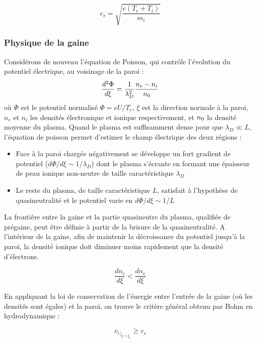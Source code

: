 \begin{refsection}
\begin{equation}
c_s=\sqrt{\frac{e (T_{e}+T_{i})}{m_{i}}}
\end{equation}

\subsubsection{Physique de la gaine}
\label{1-gaine}
Considérons de nouveau l'équation de Poisson, qui contrôle l'évolution du
potentiel électrique, au voisinage de la paroi :
\begin{equation}
\frac{d^{{2}}\Phi}{d\xi}=\frac{1}{\lambda_D^{{2}}}\frac{n_{e}-n_{i}}{n{_{0}}}
\end{equation}
 où $\Phi$ est le potentiel normalisé $\Phi=eU/T_{e}$, $\xi$ est la
 direction normale à la paroi, $n_{e}$ et $n_{i}$ les densités
 électronique et ionique respectivement, et $n{_{0}}$ la densité
 moyenne du plasma. Quand le plasma est suffisamment dense pour que $\lambda_D\ll
 L$, l'équation de poisson permet d'estimer le champ électrique des deux
 régions :

 \begin{itemize}
   \item Face à la paroi chargée négativement se
   développe un fort gradient de potentiel ($d\Phi/d\xi\sim 1/\lambda_D$) dont le plasma
   s'écrante en formant une épaisseur de peau ionique non-neutre de
   taille caractéristique $\lambda_D$
   \item Le reste du plasma, de taille caractéristique $L$, satisfait
   à l'hypothèse de quasineutralité et le potentiel varie en
   $d\Phi/d\xi\sim1/L$
 \end{itemize}

La frontière entre la gaine et la partie
quasineutre du plasma, qualifiée de prégaine, peut être définie à partir de la
brisure de la quasineutralité. A l'intérieur de la gaine, afin de maintenir la
décroissance du potentiel jusqu'à la paroi, la densité ionique doit diminuer
moins rapidement que la densité d'électrons. 

\begin{equation}
	\frac{dn_{i}}{d\xi}<\frac{dn_{e}}{d\xi}
\end{equation}

En appliquant la loi de conservation de l'énergie entre
l'entrée de la gaine (où les densités sont égales) et la paroi, on trouve le
critère général obtenu par Bohm en hydrodynamique :

\begin{equation}
	v_{{i}\,|_{\xi=\xi_s}}\geq c_{s}
\end{equation}


\end{refsection}

